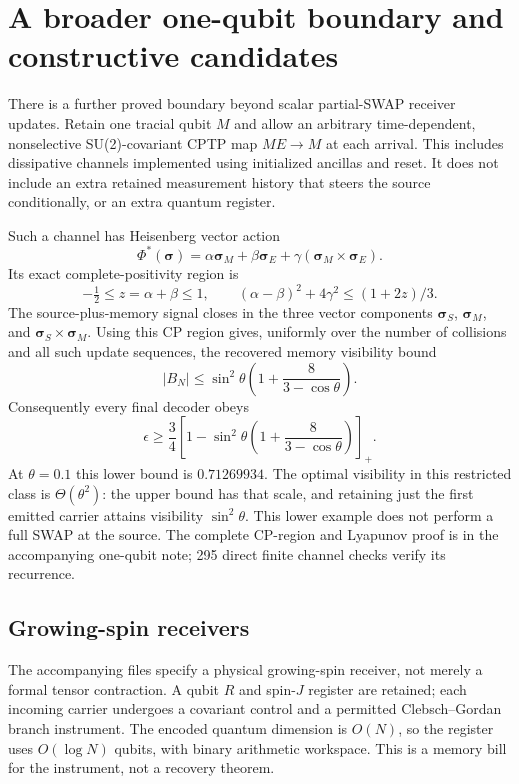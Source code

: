 \documentclass[11pt]{article}
\begin{document}
\section{A broader one-qubit boundary and constructive candidates}

There is a further proved boundary beyond scalar partial-SWAP receiver
updates. Retain one tracial qubit $M$ and allow an arbitrary time-dependent,
nonselective SU(2)-covariant CPTP map $ME\to M$ at each arrival. This includes
dissipative channels implemented using initialized ancillas and reset. It
does not include an extra retained measurement history that steers the source
conditionally, or an extra quantum register.

Such a channel has Heisenberg vector action
\[
 \Phi^*(\boldsymbol\sigma)=\alpha\boldsymbol\sigma_M
 +\beta\boldsymbol\sigma_E
 +\gamma(\boldsymbol\sigma_M\times\boldsymbol\sigma_E).
\]
Its exact complete-positivity region is
\[
 -\tfrac12\le z=\alpha+\beta\le1,\qquad
 (\alpha-\beta)^2+4\gamma^2\le(1+2z)/3.
\]
The source-plus-memory signal closes in the three vector components
$\boldsymbol\sigma_S$, $\boldsymbol\sigma_M$, and
$\boldsymbol\sigma_S\times\boldsymbol\sigma_M$.
Using this CP region gives, uniformly over the number of collisions and all
such update sequences, the recovered memory visibility bound
\[
 |B_N|\le\sin^2\theta\left(1+\frac{8}{3-\cos\theta}\right).
\]
Consequently every final decoder obeys
\[
 \epsilon\ge\frac34\left[1-\sin^2\theta
                 \left(1+\frac8{3-\cos\theta}\right)\right]_+.
\]
At $\theta=0.1$ this lower bound is $0.71269934$. The optimal visibility
in this restricted class is $\Theta(\theta^2)$: the upper bound has that
scale, and retaining just the first emitted carrier attains visibility
$\sin^2\theta$. This lower example does not perform a full SWAP at the
source. The complete CP-region and Lyapunov proof is in the accompanying
one-qubit note; 295 direct finite channel checks verify its recurrence.

\subsection{Growing-spin receivers}

The accompanying files specify a physical growing-spin receiver, not merely
a formal tensor contraction. A qubit $R$ and spin-$J$ register are retained;
each incoming carrier undergoes a covariant control and a permitted
Clebsch--Gordan branch instrument. The encoded quantum dimension is
$O(N)$, so the register uses $O(\log N)$ qubits, with binary arithmetic
workspace. This is a memory bill for the instrument, not a recovery theorem.
\end{document}
